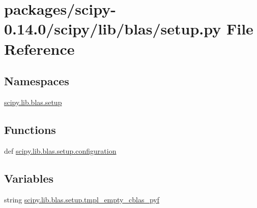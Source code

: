 \hypertarget{packages_2scipy-0_814_80_2scipy_2lib_2blas_2setup_8py}{}\section{packages/scipy-\/0.14.0/scipy/lib/blas/setup.py File Reference}
\label{packages_2scipy-0_814_80_2scipy_2lib_2blas_2setup_8py}
\subsection*{Namespaces}
\begin{DoxyCompactItemize}
\item 
 \hyperlink{namespacescipy_1_1lib_1_1blas_1_1setup}{scipy.\+lib.\+blas.\+setup}
\end{DoxyCompactItemize}
\subsection*{Functions}
\begin{DoxyCompactItemize}
\item 
def \hyperlink{namespacescipy_1_1lib_1_1blas_1_1setup_afa423b613c39667736488ee7216baa9f}{scipy.\+lib.\+blas.\+setup.\+configuration}
\end{DoxyCompactItemize}
\subsection*{Variables}
\begin{DoxyCompactItemize}
\item 
string \hyperlink{namespacescipy_1_1lib_1_1blas_1_1setup_a9397f7365bc64b629adea4a3b2345fb6}{scipy.\+lib.\+blas.\+setup.\+tmpl\+\_\+empty\+\_\+cblas\+\_\+pyf}
\end{DoxyCompactItemize}
